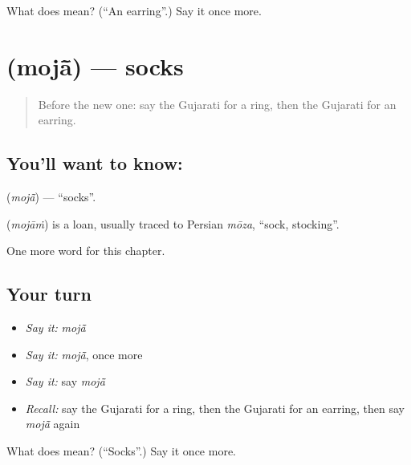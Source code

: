 \begin{tcolorbox}[breakable,colback=teal!4,colframe=teal!35!black,title={Before you move on}]
What does  mean? (\textquotedblleft{}An earring\textquotedblright{}.) Say it once more.
\end{tcolorbox}
\section[\texorpdfstring{\gu{મોજાં} (mojā̃)}{મોજાં (mojā̃)}]{ (mojā̃) — socks}

\label{lesson:GU-C111-moja}



\begin{quote}
Before the new one: say the Gujarati for a ring, then the Gujarati for an earring.
\end{quote}

\subsection*{You'll want to know: }
\textbf{} (\emph{mojā̃}) — \textquotedblleft{}socks\textquotedblright{}.

\begin{cousinweb}
\textbf{} (\emph{mojāṁ}) is a loan, usually traced to Persian \emph{mōza}, \textquotedblleft{}sock, stocking\textquotedblright{}.
\end{cousinweb}

\begin{grammarlens}[title={What you've built}]
One more word for this chapter.
\end{grammarlens}

\subsection*{Your turn}
\begin{itemize}
\raggedright
  \item \emph{Say it:} \emph{mojā̃}
  \item \emph{Say it:} \emph{mojā̃}, once more
  \item \emph{Say it:} say \emph{mojā̃}
  \item \emph{Recall:} say the Gujarati for a ring, then the Gujarati for an earring, then say \emph{mojā̃} again
\end{itemize}

\begin{tcolorbox}[breakable,colback=teal!4,colframe=teal!35!black,title={Before you move on}]
What does  mean? (\textquotedblleft{}Socks\textquotedblright{}.) Say it once more.
\end{tcolorbox}
